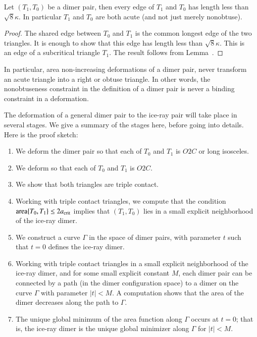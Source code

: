 \begin{lemma}  
  Let $(T_1,T_0)$ be a dimer pair, then every edge of $T_1$ and $T_0$
  has length less than $\sqrt8\kappa$.  In particular $T_1$ and $T_0$
  are both acute (and not just merely nonobtuse).
\end{lemma}

\begin{proof}  
  The shared edge between $T_0$ and $T_1$ is the common longest edge
  of the two triangles.  It is enough to show that this edge has
  length less than $\sqrt8\kappa$.  This is an edge of a subcritical
  triangle $T_1$. The result follows from Lemma~.
\end{proof}

In particular, area non-increasing deformations of a dimer pair, never
transform an acute triangle into a right or obtuse triangle.  In other
words, the nonobtuseness constraint in the definition of a dimer pair
is never a binding constraint in a deformation.

The deformation of a general dimer pair to the ice-ray pair will take
place in several stages.  We give a summary of the stages here, before
going into details.  Here is the proof sketch:

\begin{enumerate}
\item We deform the dimer pair so that each of $T_0$ and $T_1$ is $O2C$
or long isosceles.
\item We deform so that each of $T_0$ and $T_1$ is $O2C$.
\item We show that both triangles are triple contact.
\item Working with triple contact triangles, we compute that the
  condition ${\operatorname{area}}\{T_0,T_1\}\le 2a_\text{crit}$ implies that $(T_1,T_0)$
  lies in a small explicit neighborhood of the ice-ray dimer.
\item We construct a curve $\Gamma$ in the space of dimer pairs, with
  parameter $t$ such that $t=0$ defines the ice-ray dimer.
\item Working with triple contact triangles in a small explicit
  neighborhood of the ice-ray dimer, and for some small explicit
  constant $M$, each dimer pair can be connected by a path (in the
  dimer configuration space) to a dimer on the curve $\Gamma$ with
  parameter $|t|<M$.  A computation shows that the area of the dimer
  decreases along the path to $\Gamma$.
\item The unique global minimum of the area function along $\Gamma$
  occurs at $t=0$; that is, the ice-ray dimer is the unique global
  minimizer along $\Gamma$ for $|t|<M$.
\end{enumerate}

